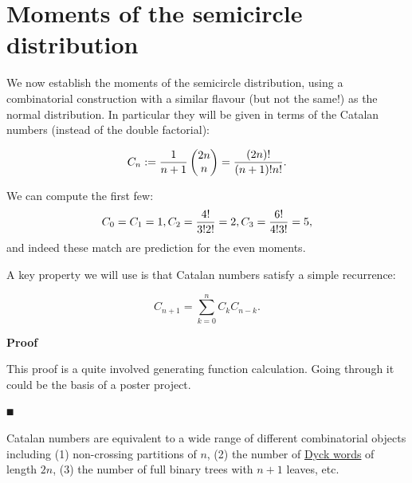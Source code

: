 \section{Moments of the semicircle distribution}
We now establish the moments of the semicircle distribution, using a combinatorial construction with a similar flavour (but not the same!) as the normal distribution. In particular they will be given in terms of the Catalan numbers (instead of the double factorial):

\begin{definition}
\[
C_n := {1 \over n+1} \begin{pmatrix} 2n \\ n \end{pmatrix} =  {(2n)! \over (n+1)! n!}.
\]
\end{definition}

We can compute the first few:
\[
C_0 = C_1 = 1, C_2 = {4! \over 3! 2!} = 2, C_3 = {6! \over 4!3!} = 5,
\]
and indeed these match are prediction for the even moments. 

A key property we will use is that Catalan numbers satisfy a simple recurrence:

\begin{lemma}
\[
C_{n+1} = \ensuremath{\sum}_{k=0}^n C_k C_{n-k}.
\]
\end{lemma}
\textbf{Proof}

This proof is a quite involved generating function calculation. Going through it could be the basis of a poster project.

\ensuremath{\QED}

Catalan numbers are equivalent to a wide range of different combinatorial objects including (1) non-crossing partitions of $n$, (2) the number of \href{https://en.wikipedia.org/wiki/Dyck_language}{Dyck words} of length $2n$, (3) the number of full binary trees with $n+1$ leaves, etc.

